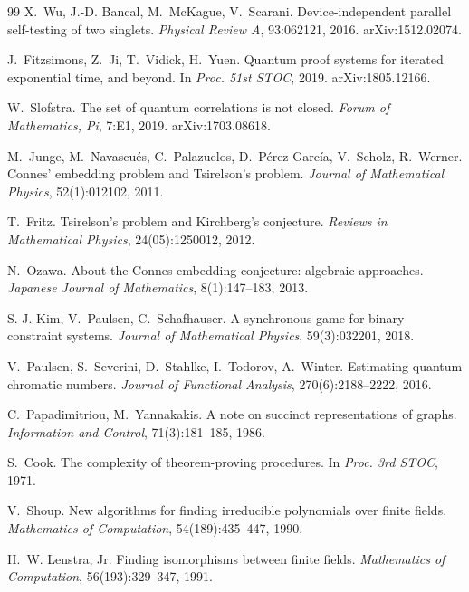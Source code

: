 \begin{thebibliography}{99}
X.~Wu, J.-D. Bancal, M.~McKague, V.~Scarani.
\newblock Device-independent parallel self-testing of two singlets.
\newblock \emph{Physical Review A}, 93:062121, 2016. arXiv:1512.02074.

J.~Fitzsimons, Z.~Ji, T.~Vidick, H.~Yuen.
\newblock Quantum proof systems for iterated exponential time, and beyond.
\newblock In \emph{Proc. 51st STOC}, 2019. arXiv:1805.12166.

W.~Slofstra.
\newblock The set of quantum correlations is not closed.
\newblock \emph{Forum of Mathematics, Pi}, 7:E1, 2019. arXiv:1703.08618.

M.~Junge, M.~Navascu\'es, C.~Palazuelos, D.~P\'erez-Garc\'ia, V.~Scholz, R.~Werner.
\newblock Connes' embedding problem and Tsirelson's problem.
\newblock \emph{Journal of Mathematical Physics}, 52(1):012102, 2011.

T.~Fritz.
\newblock Tsirelson's problem and Kirchberg's conjecture.
\newblock \emph{Reviews in Mathematical Physics}, 24(05):1250012, 2012.

N.~Ozawa.
\newblock About the Connes embedding conjecture: algebraic approaches.
\newblock \emph{Japanese Journal of Mathematics}, 8(1):147--183, 2013.

S.-J. Kim, V.~Paulsen, C.~Schafhauser.
\newblock A synchronous game for binary constraint systems.
\newblock \emph{Journal of Mathematical Physics}, 59(3):032201, 2018.

V.~Paulsen, S.~Severini, D.~Stahlke, I.~Todorov, A.~Winter.
\newblock Estimating quantum chromatic numbers.
\newblock \emph{Journal of Functional Analysis}, 270(6):2188--2222, 2016.

C.~Papadimitriou, M.~Yannakakis.
\newblock A note on succinct representations of graphs.
\newblock \emph{Information and Control}, 71(3):181--185, 1986.

S.~Cook.
\newblock The complexity of theorem-proving procedures.
\newblock In \emph{Proc. 3rd STOC}, 1971.

V.~Shoup.
\newblock New algorithms for finding irreducible polynomials over finite fields.
\newblock \emph{Mathematics of Computation}, 54(189):435--447, 1990.

H.~W. Lenstra, Jr.
\newblock Finding isomorphisms between finite fields.
\newblock \emph{Mathematics of Computation}, 56(193):329--347, 1991.


\end{thebibliography}

